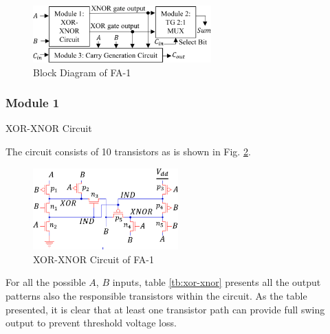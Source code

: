 \documentclass[conference]{IEEEtran}
\begin{document}
\begin{figure}[!ht]
	\centering
	\includegraphics[width=2.7in]{fa1-block diagram.png}
	\caption{Block Diagram of FA-1}
	\label{fig:fa1-bd}
\end{figure}

\subsubsection{Module 1}XOR-XNOR Circuit

The circuit consists of 10 transistors as is shown in Fig. \ref{fig:fa1-xor-xnor}.

\begin{figure}[!ht]
	\centering
	\includegraphics[width=2.2in]{fa1-xor-xnor circuit.png}
	\caption{XOR-XNOR Circuit of FA-1}
	\label{fig:fa1-xor-xnor}
\end{figure}

For all the possible \(A\), \(B\) inputs,
table \ref{tb:xor-xnor} presents all the output patterns also the responsible transistors within the circuit.
As the table presented, it is clear that at least one transistor path can provide full swing output to prevent threshold voltage loss.
\end{document}
